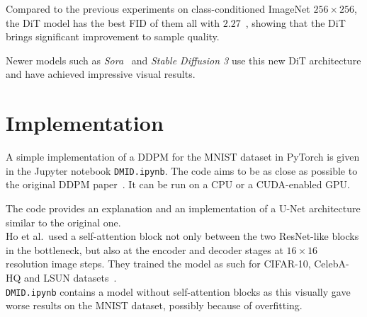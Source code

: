 \documentclass[twoside]{article}
\numberwithin{equation}{section}
\numberwithin{figure}{section}
\begin{document}
Compared to the previous experiments on class-conditioned ImageNet $256 \times 256$, the DiT model has the best FID of them all with $2.27$~\cite{peebles2023scalable}, showing that the DiT brings significant improvement to sample quality.

Newer models such as \textit{Sora}~\cite{videoworldsimulators2024} and \textit{Stable Diffusion 3} use this new DiT architecture and have achieved impressive visual results.

\newpage
\section{Implementation}
A simple implementation of a DDPM for the MNIST dataset in PyTorch is given in the Jupyter notebook \texttt{DMID.ipynb}. The code aims to be as close as possible to the original DDPM paper~\cite{ho2020denoising}. It can be run on a CPU or a CUDA-enabled GPU.

The code provides an explanation and an implementation of a U-Net architecture similar to the original one. \\
Ho et al.\ used a self-attention block not only between the two ResNet-like blocks in the bottleneck, but also at the encoder and decoder stages at $16 \times 16$ resolution image steps. They trained the model as such for CIFAR-10, CelebA-HQ and LSUN datasets~\cite{ho2020denoising}. \\
\texttt{DMID.ipynb} contains a model without self-attention blocks as this visually gave worse results on the MNIST dataset, possibly because of overfitting.
\end{document}

